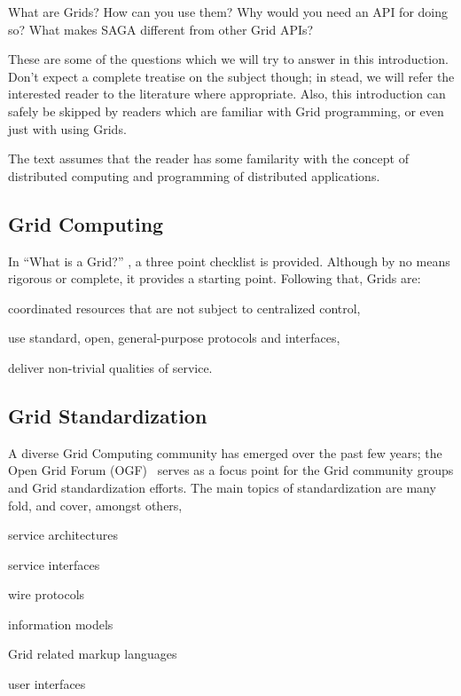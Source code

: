 
 What are Grids?  How can you use them?  Why would you need an API for
 doing so?  What makes SAGA different from other Grid APIs?

 These are some of the questions which we will try to answer in this
 introduction.  Don't expect a complete treatise on the subject though;
 in stead, we will refer the interested reader to the literature where
 appropriate.  Also, this introduction can safely be skipped by
 readers which are familiar with Grid programming, or even just with
 using Grids. 

 The text assumes that the reader has some familarity with the concept
 of distributed computing and programming of distributed
 applications.


 \subsection*{Grid Computing}

  In ``What is a Grid?'' \cite{checklist}, a three point checklist is
  provided.  Although by no means rigorous or complete, it provides a
  starting point. Following that, Grids are:

  \begin{shortenum}

   \item coordinated resources that are not subject to centralized
         control,

   \item use standard, open, general-purpose protocols and interfaces,

   \item deliver non-trivial qualities of service.

  \end{shortenum}



 \subsection*{Grid Standardization}

  A diverse Grid Computing community has emerged over the past few years; 
  the Open Grid Forum
  (OGF)~\cite{ogf} serves as a focus point for the Grid community
  groups and Grid standardization efforts.  The main topics of 
  standardization are many fold, and cover, amongst others, 

  \begin{shortlist}
   \item service architectures
   \item service interfaces
   \item wire protocols
   \item information models
   \item Grid related markup languages
   \item user interfaces
  \end{shortlist}

